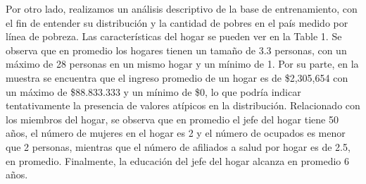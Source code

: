 \documentclass[11pt]{article}
\begin{document}
\justify 
Por otro lado, realizamos un análisis descriptivo de la base de entrenamiento, con el fin de entender su distribución y la cantidad de pobres en el país medido por línea de pobreza. Las características del hogar se pueden ver en la Table 1. Se observa que en promedio los hogares tienen un tamaño de 3.3 personas, con un máximo de 28 personas en un mismo hogar y un mínimo de 1. Por su parte, en la muestra se encuentra que el ingreso promedio de un hogar es de \$2,305,654 con un máximo de \$88.833.333 y un mínimo de \$0, lo que podría indicar tentativamente la presencia de valores atípicos en la distribución. Relacionado con los miembros del hogar, se observa que en promedio el jefe del hogar tiene 50 años, el número de mujeres en el hogar es 2 y el número de ocupados es menor que 2 personas, mientras que el número de afiliados a salud por hogar es de 2.5, en promedio. Finalmente, la educación del jefe del hogar alcanza en promedio 6 años. 




\begin{table}[!htbp] \centering 
  \caption{Estadísticas Descriptivas Variables Numéricas - Por Hogar} 
  \label{} 
\end{table} 
\end{document}

